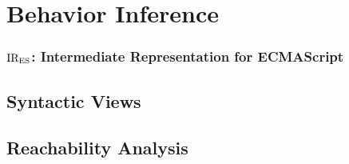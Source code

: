 \section{Behavior Inference}\label{sec:infer}

\todo

\subsubsection{$\text{IR}_\text{ES}$: Intermediate Representation for ECMAScript}

\todo

\subsection{Syntactic Views}\label{sec:view}

\todo

\subsection{Reachability Analysis}\label{sec:view}

\todo
